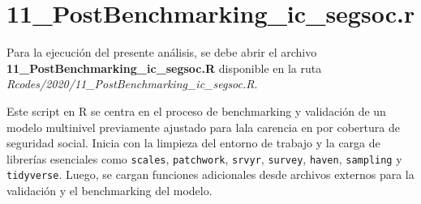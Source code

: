 \documentclass[
  12pt,
]{book}
\newenvironment{Shaded}{\begin{snugshade}}{\end{snugshade}}
\newcommand{\AttributeTok}[1]{\textcolor[rgb]{0.13,0.29,0.53}{#1}}
\newcommand{\DecValTok}[1]{\textcolor[rgb]{0.00,0.00,0.81}{#1}}
\newcommand{\FunctionTok}[1]{\textcolor[rgb]{0.13,0.29,0.53}{\textbf{#1}}}
\newcommand{\NormalTok}[1]{#1}
\newcommand{\OtherTok}[1]{\textcolor[rgb]{0.56,0.35,0.01}{#1}}
\newcommand{\SpecialCharTok}[1]{\textcolor[rgb]{0.81,0.36,0.00}{\textbf{#1}}}
\newcommand{\StringTok}[1]{\textcolor[rgb]{0.31,0.60,0.02}{#1}}
\begin{document}
\begin{Shaded}
\end{Shaded}

\hypertarget{postbenchmarking_ic_segsoc.r}{%
\chapter*{11\_PostBenchmarking\_ic\_segsoc.r}\label{postbenchmarking_ic_segsoc.r}}

Para la ejecución del presente análisis, se debe abrir el archivo \textbf{11\_PostBenchmarking\_ic\_segsoc.R} disponible en la ruta \emph{Rcodes/2020/11\_PostBenchmarking\_ic\_segsoc.R}.

Este script en R se centra en el proceso de benchmarking y validación de un modelo multinivel previamente ajustado para lala carencia en por cobertura de seguridad social. Inicia con la limpieza del entorno de trabajo y la carga de librerías esenciales como \texttt{scales}, \texttt{patchwork}, \texttt{srvyr}, \texttt{survey}, \texttt{haven}, \texttt{sampling} y \texttt{tidyverse}. Luego, se cargan funciones adicionales desde archivos externos para la validación y el benchmarking del modelo.
\end{document}
